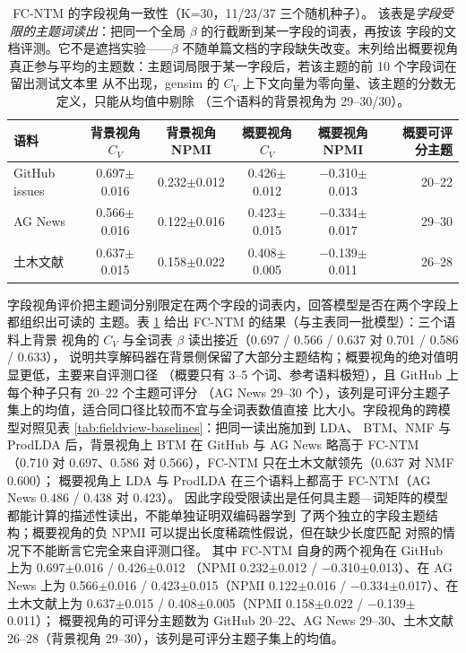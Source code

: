 \documentclass[11pt]{ctexart}
\newcommand{\fcntm}{FC-NTM}
\begin{document}
\begin{table}[t]
\centering
\caption{\fcntm{} 的字段视角一致性（K=30，11/23/37 三个随机种子）。
该表是\emph{字段受限的主题词读出}：把同一个全局 $\beta$ 的行截断到某一字段的词表，再按该
字段的文档评测。它不是遮挡实验——$\beta$ 不随单篇文档的字段缺失改变。末列给出概要视角
真正参与平均的主题数：主题词局限于某一字段后，若该主题的前 10 个字段词在留出测试文本里
从不出现，gensim 的 $C_V$ 上下文向量为零向量、该主题的分数无定义，只能从均值中剔除
（三个语料的背景视角为 29--30/30）。}
\label{tab:fieldview}
\small
\begin{tabular}{lcccc r}
\toprule
语料 & 背景视角 $C_V$ & 背景视角 NPMI & 概要视角 $C_V$ & 概要视角 NPMI & 概要可评分主题 \\
\midrule
GitHub issues & 0.697$\pm$0.016 & 0.232$\pm$0.012 & 0.426$\pm$0.012 & $-$0.310$\pm$0.013 & 20--22 \\
AG News & 0.566$\pm$0.016 & 0.122$\pm$0.016 & 0.423$\pm$0.015 & $-$0.334$\pm$0.017 & 29--30 \\
土木文献 & 0.637$\pm$0.015 & 0.158$\pm$0.022 & 0.408$\pm$0.005 & $-$0.139$\pm$0.011 & 26--28 \\
\bottomrule
\end{tabular}
\end{table}

字段视角评价把主题词分别限定在两个字段的词表内，回答模型是否在两个字段上都组织出可读的
主题。表 \ref{tab:fieldview} 给出 \fcntm{} 的结果（与主表同一批模型）：三个语料上背景
视角的 $C_V$ 与全词表 $\beta$ 读出接近（0.697 / 0.566 / 0.637 对 0.701 / 0.586 / 0.633），
说明共享解码器在背景侧保留了大部分主题结构；概要视角的绝对值明显更低，主要来自评测口径
（概要只有 3--5 个词、参考语料极短），且 GitHub 上每个种子只有 20--22 个主题可评分
（AG News 29--30 个），该列是可评分主题子集上的均值，适合同口径比较而不宜与全词表数值直接
比大小。字段视角的跨模型对照见表 \ref{tab:fieldview-baselines}：把同一读出施加到 LDA、
BTM、NMF 与 ProdLDA 后，背景视角上 BTM 在 GitHub 与 AG News 略高于 \fcntm{}
（0.710 对 0.697、0.586 对 0.566），\fcntm{} 只在土木文献领先（0.637 对 NMF 0.600）；
概要视角上 LDA 与 ProdLDA 在三个语料上都高于 \fcntm{}（AG News 0.486 / 0.438 对 0.423）。
因此字段受限读出是任何具主题—词矩阵的模型都能计算的描述性读出，不能单独证明双编码器学到
了两个独立的字段主题结构；概要视角的负 NPMI 可以提出长度稀疏性假说，但在缺少长度匹配
对照的情况下不能断言它完全来自评测口径。
其中 \fcntm{} 自身的两个视角在 GitHub 上为 0.697$\pm$0.016 / 0.426$\pm$0.012
（NPMI 0.232$\pm$0.012 / $-$0.310$\pm$0.013）、在 AG News 上为 0.566$\pm$0.016 /
0.423$\pm$0.015（NPMI 0.122$\pm$0.016 / $-$0.334$\pm$0.017）、在土木文献上为
0.637$\pm$0.015 / 0.408$\pm$0.005（NPMI 0.158$\pm$0.022 / $-$0.139$\pm$0.011）；
概要视角的可评分主题数为 GitHub 20--22、AG News 29--30、土木文献 26--28（背景视角
29--30），该列是可评分主题子集上的均值。
\end{document}
